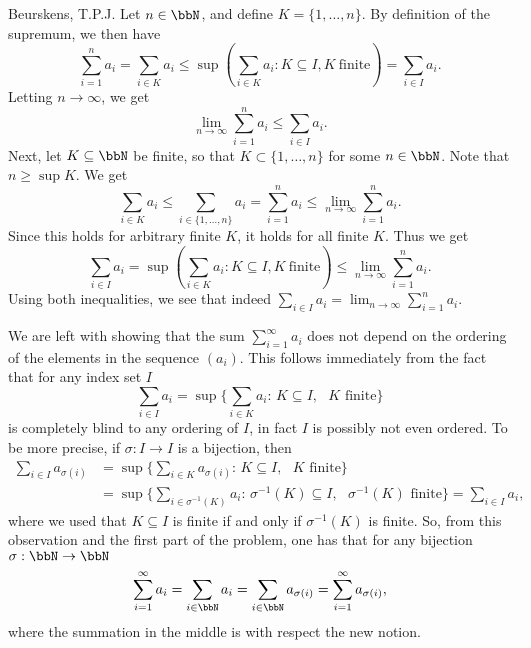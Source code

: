 \begin{solution}[1.10]{Beurskens, T.P.J.}
Let $n \in \bbN$, and define $K = \{1, \ldots, n\}$.
By definition of the supremum, we then have
$$\sum_{i = 1}^n a_i = \sum_{i \in K} a_i \leq \sup \left( \sum_{i \in K} a_i : K \subseteq I, K~\text{finite} \right) = \sum_{i \in I} a_i.$$
Letting $n \to \infty$, we get
\[
\lim_{n \to \infty} \sum^n_{i = 1} a_i \leq \sum_{i \in I} a_i.
\]
Next, let $K \subseteq \bbN$ be finite, so that $K \subset \{1, \ldots, n\}$ for some $n \in \bbN$.
Note that $n \geq \sup K$.
We get
\[
\sum_{i \in K} a_i \leq \sum_{i \in \{1,\ldots, n\}} a_i = \sum_{i = 1}^n  a_i \leq \lim_{n\to\infty} \sum_{i = 1}^n  a_i.
\]
Since this holds for arbitrary finite $K$, it holds for all finite $K$.
Thus we get
\[
\sum_{i \in I} a_i = \sup \left( \sum_{i \in K} a_i : K \subseteq I, K~\text{finite} \right) \leq \lim_{n\to\infty} \sum_{i = 1}^n  a_i.
\]
Using both inequalities, we see that indeed $\sum_{i \in I} a_i = \lim_{n \to \infty} \sum^n_{i = 1} a_i$. 

We are left with showing that the sum $\sum_{i = 1}^\infty a_i$ does not depend on the ordering of the elements in the sequence $(a_i)$. This follows immediately from the fact that for any index set $I$
\begin{equation*}
	\sum_{i \in I} a_i = \sup\Big\{\sum_{i\in K} a_i:\, K\subseteq I,\text{ $K$ finite}\Big\}
\end{equation*}
is completely blind to any ordering of $I$, in fact $I$ is possibly not even ordered. To be more precise, if $\sigma:I\to I$ is a bijection, then
\begin{equation*}
	\begin{aligned}
	\sum_{i \in I} a_{\sigma(i)} & =  \sup\Big\{\sum_{i\in K} a_{\sigma(i)}:\, K\subseteq I,\text{ $K$ finite}\Big\} \\ 
	& = \sup\Big\{\sum_{i\in \sigma^{-1}(K)} a_i:\, \sigma^{-1}(K)\subseteq I,\text{ $\sigma^{-1}(K)$ finite}\Big\} = \sum_{i \in I} a_{i},
	\end{aligned}
\end{equation*}
where we used that $K\subseteq I$ is finite if and only if $\sigma^{-1}(K)$ is finite.
So, from this observation and the first part of the problem, one has that for any bijection $\sigma:\bbN\to \bbN$
\begin{equation*}
	\sum^\infty_{i = 1} a_i = \sum_{i\in \bbN} a_i = \sum_{i\in \bbN} a_{\sigma(i)} = \sum_{i = 1}^\infty a_{\sigma(i)},
\end{equation*}
where the summation in the middle is with respect the new notion.
\end{solution}

